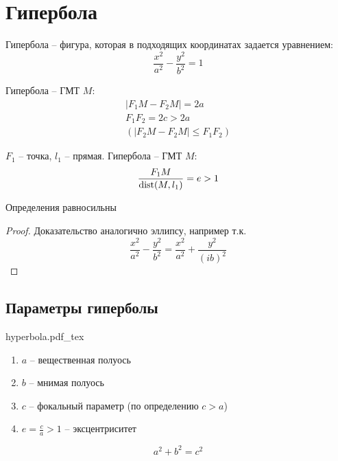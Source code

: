 \documentclass[main]{subfiles}
\begin{document}
\chapter{Гипербола}
\begin{definition}
    Гипербола -- фигура, которая в подходящих координатах задается уравнением:
    \[\frac{x^2}{a^2} - \frac{y^2}{b^2}=1\]
\end{definition}
\begin{definition}
    Гипербола -- ГМТ $M:$
    \begin{gather*}
        |F_1 M - F_2M|=2a\\
        F_1 F_2 = 2c > 2a\\
        (|F_2 M - F_2 M| \le F_1 F_2)
    \end{gather*}
\end{definition}
\begin{definition}
    $F_1$ -- точка, $l_1$ -- прямая. Гипербола -- ГМТ $M$:
    \[\frac{F_1 M}{\operatorname{dist}(M,l_1)} = e > 1\]
\end{definition}

\begin{theorem}
    Определения равносильны
\end{theorem}
\begin{proof}
    Доказательство аналогично эллипсу, например т.к.
    \[\frac{x^2}{a^2} - \frac{y^2}{b^2} = \frac{x^2}{a^2} + \frac{y^2}{(ib)^2}\]
\end{proof}

\section*{Параметры гиперболы}
\begin{center}
    {hyperbola.pdf_tex}
\end{center}
\begin{enumerate}
    \item $a$ -- вещественная полуось
    \item $b$ -- мнимая полуось
    \item $c$ -- фокальный параметр (по определению $c>a$)
    \item $e = \frac{c}{a}>1$ -- эксцентриситет
\end{enumerate}
\[a^2+b^2=c^2\]
\end{document}
